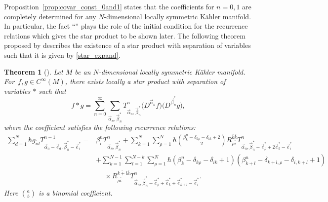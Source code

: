 \documentclass[10pt,a4paper]{amsart}
\numberwithin{equation}{section}
\newtheorem{Theorem}{Theorem}[section]
\begin{document}
Proposition~\ref{prop:covar_const_0and1} states that the coefficients for $n=0,1$ are completely determined for any $N$-dimensional locally symmetric K\"ahler manifold.
In particular,
the fact ``'' plays the role of the initial condition for the recurrence relations which
gives the star product to be shown later.
The following theorem proposed by %
\cite{HS1,HS2} describes the existence of a star product with separation of variables such that it is given by \eqref{star_expand}.

\begin{Theorem}[\cite{HS1,HS2}] \label{theorem:star_prd}
 Let $M$ be an $N$-dimensional locally symmetric K\"ahler manifold. For~${f,g
 \in
 C^{\infty}(M)}
 $,
 there exists locally a star product with separation of variables $\ast$ such that
 \[%
 f
 \ast
 g
 =
 \sum_{n=0}^{\infty}
 \sum_{\vec{\alpha}_{n},\vec{\beta}_{n}^{\ast}}
 T_{\vec{\alpha}_{n},\vec{\beta}_{n}^{\ast}}^{n}
 \bigl(
 D^{\vec{\alpha}_{n}}f
 \bigr)
 \bigl(
 D^{\vec{\beta}_{n}^{\ast}}g
 \bigr),
 \]
 where the coefficient
 satisfies the following recurrence relations:
 \begin{align}
 \sum_{d=1}^{N}
 \hbar
 g_{\overline{i}d}
 T_{\vec{\alpha}_{n}-\vec{e}_{d},\vec{\beta}_{n}^{\ast}-\vec{e}_{i}^{\ast}}^{n-1}
 ={}&
 \beta_{i}^{n}
 T_{\vec{\alpha}_{n},\vec{\beta}_{n}^{\ast}}^{n}
 +
 \sum_{k=1}^{N}
 \sum_{\rho=1}^{N}
 \hbar
 \binom{\beta_{k}^{n}-\delta_{k\rho}-\delta_{ik}+2}{2}
 R_{\overline{\rho}\overline{i}}^{\overline{k}\overline{k}}
 T_{\vec{\alpha}_{n},\vec{\beta}_{n}^{\ast}-\vec{e}_{\rho}^{\ast}+2\vec{e}_{k}^{\ast}-\vec{e}_{i}^{\ast}}^{n}
 \nonumber
 \\
 &
 +
 \sum_{k=1}^{N-1}
 \sum_{l=1}^{N-k}
 \sum_{\rho=1}^{N}
 \hbar
 (
 \beta_{k}^{n}
 -
 \delta_{k\rho}
 -
 \delta_{ik}
 +
 1
 )
 (
 \beta_{k+l}^{n}
 -
 \delta_{k+l,\rho}
 -
 \delta_{i,k+l}
 +
 1
 ) \nonumber\\
 &\phantom{+}{}\times
 R_{\overline{\rho}\overline{i}}^{\overline{k+l}\overline{k}}
 T_{
 \vec{\alpha}_{n},
 \vec{\beta}_{n}^{\ast}
 -
 \vec{e}_{\rho}^{\ast}
 +
 \vec{e}_{k}^{\ast}
 +
 \vec{e}_{k+l}^{\ast}
 -
 \vec{e}_{i}^{\ast}
 }^{n}.
 \label{HS_recrel}
 \end{align}
 Here
 $
 \binom{a}{b}
 $
 is a binomial coefficient.
\end{Theorem}
\end{document}
